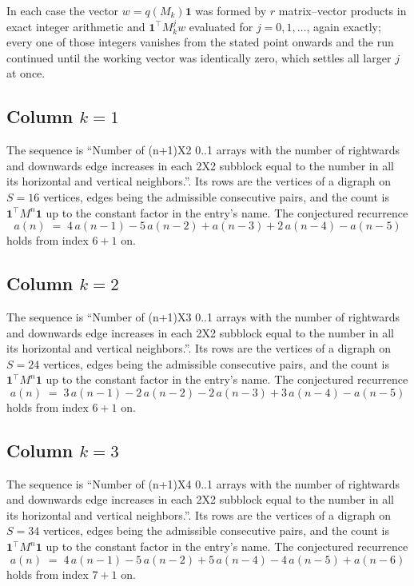 \documentclass[11pt,a4paper]{article}
\theoremstyle{plain}
\theoremstyle{definition}
\begin{document}
In each case the vector $w=q(M_k)\mathbf{1}$ was formed by $r$ matrix--vector products in
exact integer arithmetic and $\mathbf{1}^{\!\top}M_k^{j}w$ evaluated for $j=0,1,\dots$,
again exactly; every one of those integers vanishes from the stated point onwards and the run
continued until the working vector was identically zero, which settles all larger $j$ at once.

\subsection*{Column $k$$=1$}
The sequence is ``Number of (n+1)X2 0..1 arrays with the number of rightwards and downwards edge increases in each 2X2 subblock equal to the number in all its horizontal and vertical neighbors.''. Its rows are the vertices of a digraph on
$S=16$ vertices, edges being the admissible consecutive pairs, and the count is
$\mathbf{1}^{\!\top}M^{n}\mathbf{1}$ up to the constant factor in the entry's name.
The conjectured recurrence
\[
a(n)\;=\;4\,a(n-1) - 5\,a(n-2) + a(n-3) + 2\,a(n-4) - a(n-5)
\]
holds from index $6+1$ on.

\subsection*{Column $k$$=2$}
The sequence is ``Number of (n+1)X3 0..1 arrays with the number of rightwards and downwards edge increases in each 2X2 subblock equal to the number in all its horizontal and vertical neighbors.''. Its rows are the vertices of a digraph on
$S=24$ vertices, edges being the admissible consecutive pairs, and the count is
$\mathbf{1}^{\!\top}M^{n}\mathbf{1}$ up to the constant factor in the entry's name.
The conjectured recurrence
\[
a(n)\;=\;3\,a(n-1) - 2\,a(n-2) - 2\,a(n-3) + 3\,a(n-4) - a(n-5)
\]
holds from index $6+1$ on.

\subsection*{Column $k$$=3$}
The sequence is ``Number of (n+1)X4 0..1 arrays with the number of rightwards and downwards edge increases in each 2X2 subblock equal to the number in all its horizontal and vertical neighbors.''. Its rows are the vertices of a digraph on
$S=34$ vertices, edges being the admissible consecutive pairs, and the count is
$\mathbf{1}^{\!\top}M^{n}\mathbf{1}$ up to the constant factor in the entry's name.
The conjectured recurrence
\[
a(n)\;=\;4\,a(n-1) - 5\,a(n-2) + 5\,a(n-4) - 4\,a(n-5) + a(n-6)
\]
holds from index $7+1$ on.
\end{document}
